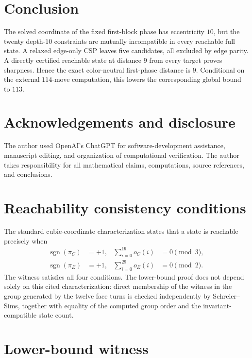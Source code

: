 \documentclass[11pt]{article}
\theoremstyle{definition}
\begin{document}
\section{Conclusion}

The solved coordinate of the fixed first-block phase has eccentricity $10$, but the twenty depth-$10$ constraints are mutually incompatible in every reachable full state.  A relaxed edge-only CSP leaves five candidates, all excluded by edge parity.  A directly certified reachable state at distance $9$ from every target proves sharpness.  Hence the exact color-neutral first-phase distance is $9$.  Conditional on the external $114$-move computation, this lowers the corresponding global bound to $113$.

\section*{Acknowledgements and disclosure}

The author used OpenAI's ChatGPT for software-development assistance, manuscript editing, and organization of computational verification.  The author takes responsibility for all mathematical claims, computations, source references, and conclusions.

\appendix

\section{Reachability consistency conditions}\label{sec:reachability-note}

The standard cubie-coordinate characterization states that a state is reachable precisely when
\begin{align*}
\operatorname{sgn}(\pi_C)&=+1,& \sum_{i=0}^{19}o_C(i)&=0\pmod3,\\
\operatorname{sgn}(\pi_E)&=+1,& \sum_{i=0}^{29}o_E(i)&=0\pmod2.
\end{align*}
The witness satisfies all four conditions.  The lower-bound proof does not depend solely on this cited characterization: direct membership of the witness in the group generated by the twelve face turns is checked independently by Schreier--Sims, together with equality of the computed group order and the invariant-compatible state count.

\section{Lower-bound witness}\label{app:witness}
\end{document}
